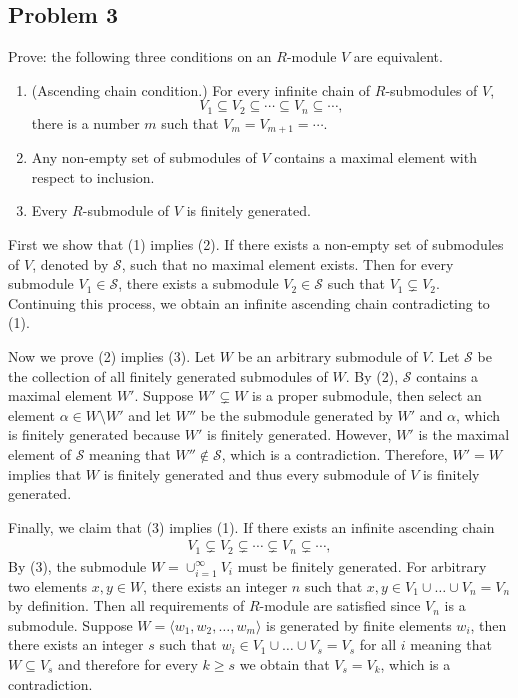 \subsection*{Problem 3}
Prove: the following three conditions on an $R$-module $V$ are equivalent.
\begin{enumerate}
    \item[(1)] (Ascending chain condition.) For every infinite chain of $R$-submodules of $V$, 
    $$V_1 \subseteq V_2 \subseteq \cdots \subseteq V_n \subseteq \cdots,$$
    there is a number $m$ such that $V_m = V_{m+1} = \cdots$.
    \item[(2)] Any non-empty set of submodules of $V$ contains a maximal element with respect to inclusion.
    \item[(3)] Every $R$-submodule of $V$ is finitely generated.
\end{enumerate}
\begin{solution}
    First we show that (1) implies (2). If there exists a non-empty set of submodules of $V$, denoted by $\mathcal{S}$, such that no maximal element exists.
    Then for every submodule $V_1\in\mathcal{S}$, there exists a submodule $V_2\in\mathcal{S}$ such that $V_1\subsetneq V_2$. Continuing this process, we obtain an infinite ascending chain
    contradicting to (1).

    Now we prove (2) implies (3). Let $W$ be an arbitrary submodule of $V$. Let $\mathcal{S}$ be the collection of all finitely generated submodules of $W$. By (2), $\mathcal{S}$ contains a maximal element $W'$. Suppose $W'\subsetneq W$ is a proper submodule,
    then select an element $\alpha\in W\setminus W'$ and let $W''$ be the submodule generated by $W'$ and $\alpha$, which is finitely generated because $W'$ is finitely generated. However, $W'$ is the maximal element of $\mathcal{S}$
    meaning that $W''\notin \mathcal{S}$, which is a contradiction. Therefore, $W'=W$ implies that $W$ is finitely generated and thus
    every submodule of $V$ is finitely generated. 

    Finally, we claim that (3) implies (1). If there exists an infinite ascending chain 
    \begin{align*}
        V_1 \subsetneq V_2 \subsetneq \cdots \subsetneq V_n \subsetneq \cdots,
    \end{align*}
    By (3), the submodule $W= \cup_{i=1}^\infty V_i$ must be finitely generated.
    For arbitrary two elements $x,y\in W$, there exists an integer $n$ such that $x,y\in V_1\cup\dots\cup V_n= V_n$ by definition. Then all requirements of $R$-module are satisfied since $V_n$
    is a submodule. Suppose $W=\langle w_1, w_2, \dots, w_m \rangle$ is generated by finite elements $w_i$, then there exists an integer $s$ such that 
    $w_i\in V_1\cup\dots\cup V_s=V_s$ for all $i$ meaning that $W\subseteq V_s$ and therefore for every $k\ge s$ we obtain that $V_s=V_k$, which is a contradiction.
\end{solution}



